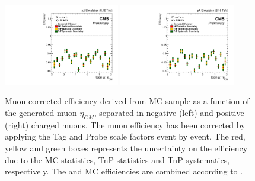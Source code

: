 \begin{figure}[htb!]
 \begin{center}
   \includegraphics[width=0.45\textwidth]{Figures/WBoson/Analysis/Efficiency/Muon/PA/eff1D_EtaCM_MC_WToMuNu_PA_Minus_Total_TnP_Nominal}
   \includegraphics[width=0.45\textwidth]{Figures/WBoson/Analysis/Efficiency/Muon/PA/eff1D_EtaCM_MC_WToMuNu_PA_Plus_Total_TnP_Nominal}
 \end{center}
 \caption{Muon corrected efficiency derived from \WToMuNu \POWHEG MC sample as a function of the generated muon $\eta_{CM}$, separated in negative (left) and positive (right) charged muons. The muon efficiency has been corrected by applying the Tag and Probe scale factors event by event. The red, yellow and green boxes represents the uncertainty on the efficiency due to the MC statistics, TnP statistics and TnP systematics, respectively. The \pPb and \Pbp MC efficiencies are combined according to .}
 \label{fig:CorrEfficiency}
\end{figure}




\clearpage
